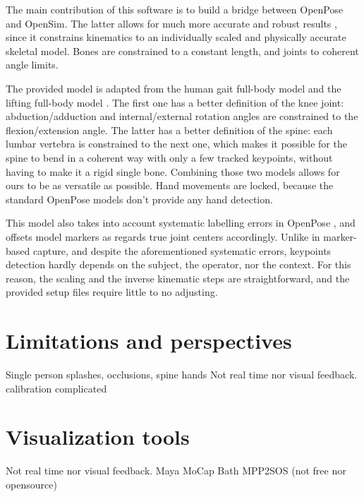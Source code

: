 The main contribution of this software is to build a bridge between OpenPose and OpenSim. The latter allows for much more accurate and robust results \cite{Pagnon2022}, since it constrains kinematics to an individually scaled and physically accurate skeletal model. Bones are constrained to a constant length, and joints to coherent angle limits.

The provided model is adapted from the human gait full-body model \cite{Rajagopal2016} and the lifting full-body model \cite{Beaucage2019}. The first one has a better definition of the knee joint: abduction/adduction and internal/external rotation angles are constrained to the flexion/extension angle. The latter has a better definition of the spine: each lumbar vertebra is constrained to the next one, which makes it possible for the spine to bend in a coherent way with only a few tracked keypoints, without having to make it a rigid single bone. Combining those two models allows for ours to be as versatile as possible. Hand movements are locked, because the standard OpenPose models don't provide any hand detection.

This model also takes into account systematic labelling errors in OpenPose \cite{Needham2021}, and offsets model markers as regards true joint centers accordingly. Unlike in marker-based capture, and despite the aforementioned systematic errors, keypoints detection hardly depends on the subject, the operator, nor the context. For this reason, the scaling and the inverse kinematic steps are straightforward, and the provided setup files require little to no adjusting.



\section{Limitations and perspectives}
Single person
splashes, occlusions, 
spine
hands
Not real time nor visual feedback.
calibration complicated

\section{Visualization tools}

Not real time nor visual feedback.
Maya MoCap
Bath
MPP2SOS (not free nor opensource) \cite{Barreto2022}



